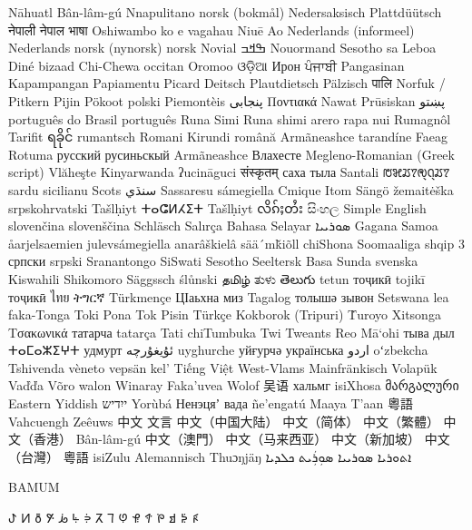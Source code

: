 Nāhuatl
Bân-lâm-gú
Nnapulitano
norsk (bokmål)
Nedersaksisch
Plattdüütsch
नेपाली
नेपाल भाषा
Oshiwambo
ko e vagahau Niuē
Ao
Nederlands (informeel)
Nederlands
norsk (nynorsk)
norsk
Novial
ߒߞߏ
Nouormand
Sesotho sa Leboa
Diné bizaad
Chi-Chewa
occitan
Oromoo
ଓଡ଼ିଆ
Ирон
ਪੰਜਾਬੀ
Pangasinan
Kapampangan
Papiamentu
Picard
Deitsch
Plautdietsch
Pälzisch
पालि
Norfuk / Pitkern
Pijin
Pökoot
polski
Piemontèis
پنجابی
Ποντιακά
Nawat
Prūsiskan
پښتو
português do Brasil
português
Runa Simi
Runa shimi
arero rapa nui
Rumagnôl
Tarifit
ရခိုင်
rumantsch
Romani
Kirundi
română
Armãneashce
tarandíne
Faeag Rotuma
русский
русиньскый
Armãneashce
Влахесте
Megleno-Romanian (Greek script)
Vlăheşte
Kinyarwanda
ʔucināguci
संस्कृतम्
саха тыла
Santali
ꢱꣃꢬꢵꢯ꣄ꢡ꣄ꢬꢵ
sardu
sicilianu
Scots
سنڌي
Sassaresu
sámegiella
Cmique Itom
Sängö
žemaitėška
srpskohrvatski
Tašlḥiyt
ⵜⴰⵛⵍⵃⵉⵜ
Tašlḥiyt
လိၵ်ႈတႆး
සිංහල
Simple English
slovenčina
slovenščina
Schläsch
Salırça
Bahasa Selayar
ܣܘܪܝܝܐ
Gagana Samoa
åarjelsaemien
julevsámegiella
anarâškielâ
sää´mǩiõll
chiShona
Soomaaliga
shqip
3
српски
srpski
Sranantongo
SiSwati
Sesotho
Seeltersk
Basa Sunda
svenska
Kiswahili
Shikomoro
Säggssch
ślůnski
தமிழ்
ತುಳು
తెలుగు
tetun
тоҷикӣ
tojikī
тоҷикӣ
ไทย
ትግርኛ
Türkmençe
ЦӀаьхна миз
Tagalog
толышә зывон
Setswana
lea faka-Tonga
Toki Pona
Tok Pisin
Türkçe
Kokborok (Tripuri)
Ṫuroyo
Xitsonga
Τσακωνικά
татарча
tatarça
Tati
chiTumbuka
Twi
Tweants
Reo Mā`ohi
тыва дыл
ⵜⴰⵎⴰⵣⵉⵖⵜ
удмурт
ئۇيغۇرچە
uyghurche
уйғурчә
українська
اردو
oʻzbekcha
Tshivenda
vèneto
vepsän kel’
Tiếng Việt
West-Vlams
Mainfränkisch
Volapük
Vaďďa
Võro
walon
Winaray
Faka'uvea
Wolof
吴语
хальмг
isiXhosa
მარგალური
Eastern Yiddish
ייִדיש
Yorùbá
Ненэцяʼ вада
ñe'engatú
Maaya T'aan
粵語
Vahcuengh
Zeêuws
中文
文言
中文（中国大陆）
中文（简体）
中文（繁體）
中文（香港）
Bân-lâm-gú
中文（澳門）
中文（马来西亚）
中文（新加坡）
中文（台灣）
粵語
isiZulu
Alemannisch
Thuɔŋjäŋ
ܐܬܘܪܝܐ 
ܣܘܪܝܝܐ
ܣܘܼܪܲܝܬ
ܟܠܕܝܐ


BAMUM

ꚠ	ꚡ	ꚢ	ꚣ	ꚤ	ꚥ	ꚦ	ꚧ	ꚨ	ꚩ	ꚪ	ꚫ	ꚬ	ꚭ	ꚮ	ꚯ

\egroup












